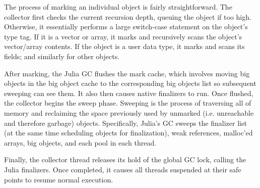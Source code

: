 The process of marking an individual object is fairly straightforward.
The collector first checks the current recursion depth, queuing the object if too high.
Otherwise, it essentially performs a large switch-case statement on the object's type tag.
If it is a vector or array, it marks and recursively scans the object's vector/array contents.
If the object is a user data type, it marks and scans its fields; and similarly for other objects.

After marking, the Julia GC flushes the mark cache, which involves moving big objects in the big object cache to the corresponding big objects list so subsequent sweeping can see them.
It also then causes native finalizers to run.
Once flushed, the collector begins the sweep phase.
Sweeping is the process of traversing all of memory and reclaiming the space previously used by unmarked (i.e. unreachable and therefore garbage) objects.
Specifically, Julia's GC sweeps the finalizer list (at the same time scheduling objects for finalization), weak references, malloc'ed arrays, big objects, and each pool in each thread.

Finally, the collector thread releases its hold of the global GC lock, calling the Julia finalizers.
Once completed, it causes all threads suspended at their safe points to resume normal execution.


